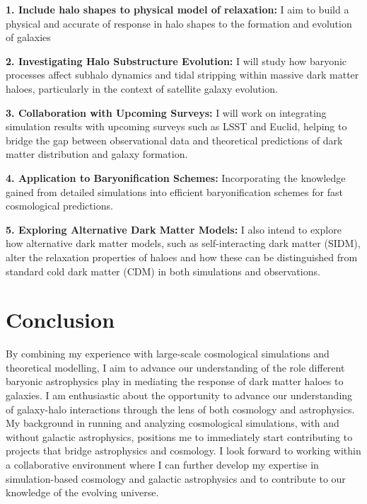 \documentclass[11pt]{article}
\begin{document}


\textbf{1. Include halo shapes to physical model of relaxation:}  
I aim to build a physical and accurate of response in halo shapes to the formation and evolution of galaxies

\textbf{2. Investigating Halo Substructure Evolution:}  
I will study how baryonic processes affect subhalo dynamics and tidal stripping within massive dark matter haloes, particularly in the context of satellite galaxy evolution.

\textbf{3. Collaboration with Upcoming Surveys:}  
I will work on integrating simulation results with upcoming surveys such as LSST and Euclid, helping to bridge the gap between observational data and theoretical predictions of dark matter distribution and galaxy formation.

\textbf{4. Application to Baryonification Schemes:}  
Incorporating the knowledge gained from detailed simulations into efficient baryonification schemes for fast cosmological predictions.

\textbf{5. Exploring Alternative Dark Matter Models:}  
I also intend to explore how alternative dark matter models, such as self-interacting dark matter (SIDM), alter the relaxation properties of haloes and how these can be distinguished from standard cold dark matter (CDM) in both simulations and observations.



\section{Conclusion}
By combining my experience with large-scale cosmological simulations and theoretical modelling, I aim to advance our understanding of the role different baryonic astrophysics play in mediating the response of dark matter haloes to galaxies. I am enthusiastic about the opportunity to advance our understanding of galaxy-halo interactions through the lens of both cosmology and astrophysics. My background in running and analyzing cosmological simulations, with and without galactic astrophysics, positions me to immediately start contributing to projects that bridge astrophysics and cosmology. I look forward to working within a collaborative environment where I can further develop my expertise in simulation-based cosmology and galactic astrophysics and to contribute to our knowledge of the evolving universe.


% 
\printbibliography
\end{document}
